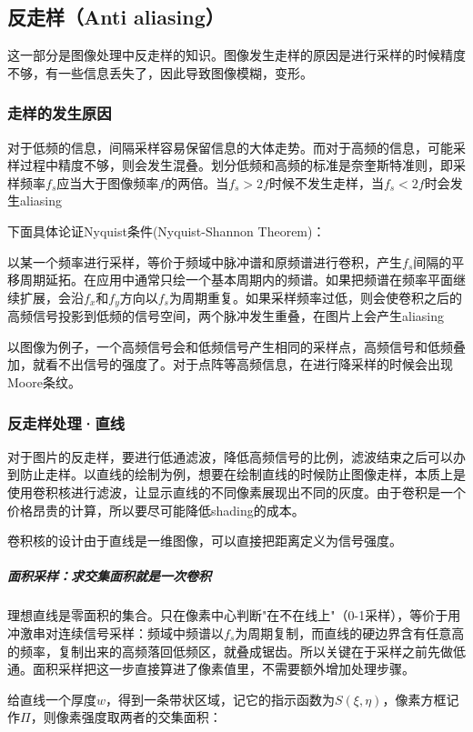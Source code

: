 \subsection{反走样（Anti aliasing）}

这一部分是图像处理中反走样的知识。图像发生走样的原因是进行采样的时候精度不够，有一些信息丢失了，因此导致图像模糊，变形。

\subsubsection{走样的发生原因}

对于低频的信息，间隔采样容易保留信息的大体走势。而对于高频的信息，可能采样过程中精度不够，则会发生混叠。划分低频和高频的标准是奈奎斯特准则，即采样频率$f_s$应当大于图像频率$f$的两倍。当$f_s > 2f$时候不发生走样，当$f_s < 2f$时会发生aliasing

下面具体论证Nyquist条件(Nyquist-Shannon Theorem)：

以某一个频率进行采样，等价于频域中脉冲谱和原频谱进行卷积，产生$f_s$间隔的平移周期延拓。在应用中通常只绘一个基本周期内的频谱。如果把频谱在频率平面继续扩展，会沿$f_x$和$f_y$方向以$f_s$为周期重复。如果采样频率过低，则会使卷积之后的高频信号投影到低频的信号空间，两个脉冲发生重叠，在图片上会产生aliasing

以图像为例子，一个高频信号会和低频信号产生相同的采样点，高频信号和低频叠加，就看不出信号的强度了。对于点阵等高频信息，在进行降采样的时候会出现Moore条纹。

\subsubsection{反走样处理·直线}

对于图片的反走样，要进行低通滤波，降低高频信号的比例，滤波结束之后可以办到防止走样。以直线的绘制为例，想要在绘制直线的时候防止图像走样，本质上是使用卷积核进行滤波，让显示直线的不同像素展现出不同的灰度。由于卷积是一个价格昂贵的计算，所以要尽可能降低shading的成本。

卷积核的设计由于直线是一维图像，可以直接把距离定义为信号强度。

\subparagraph{面积采样：求交集面积就是一次卷积}

理想直线是零面积的集合。只在像素中心判断"在不在线上"（0-1采样），等价于用冲激串对连续信号采样：频域中频谱以$f_s$为周期复制，而直线的硬边界含有任意高的频率，复制出来的高频落回低频区，就叠成锯齿。所以关键在于采样之前先做低通。面积采样把这一步直接算进了像素值里，不需要额外增加处理步骤。

给直线一个厚度$w$，得到一条带状区域，记它的指示函数为$S(\xi,\eta)$，像素方框记作$\Pi$，则像素强度取两者的交集面积：

